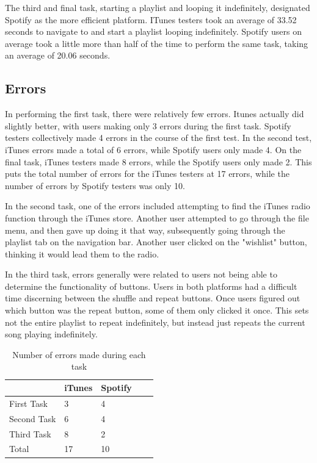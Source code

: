 \documentclass[12pt]{report}
\begin{document}
The third and final task, starting a playlist and looping it 
indefinitely, designated Spotify as the more efficient platform. 
ITunes testers took an average of 33.52 seconds to navigate to and 
start a playlist looping indefinitely. Spotify users on average 
took a little more than half of the time to perform the same task, 
taking an average of 20.06 seconds.

\subsection{Errors}

In performing the first task, there were relatively few errors. 
Itunes actually did slightly better, with users making only 3 
errors during the first task. Spotify testers collectively made 4 
errors in the course of the first test. In the second test, iTunes 
errors made a total of 6 errors, while Spotify users only made 4. 
On the final task, iTunes testers made 8 errors, while the Spotify 
users only made 2. This puts the total number of errors for the 
iTunes testers at 17 errors, while the number of errors by Spotify 
testers was only 10.

In the second task, one of the errors included attempting to find 
the iTunes radio function through the iTunes store. Another user 
attempted to go through the file menu, and then gave up doing it 
that way, subsequently going through the playlist tab on the 
navigation bar. Another user clicked on the "wishlist" button, 
thinking it would lead them to the radio.

In the third task,  errors generally were related to users not 
being able to determine the functionality of buttons. Users in 
both platforms had a difficult time discerning between the shuffle 
and repeat buttons. Once users figured out which button was the 
repeat button, some of them only clicked it once. This sets not 
the entire playlist to repeat indefinitely, but instead just 
repeats the current song playing indefinitely.

\begin{table}[h]
\centering
\begin{tabular}{lllll}
\hline
            & iTunes & Spotify &  &  \\ \hline
First Task  & 3      & 4       &  &  \\
Second Task & 6      & 4       &  &  \\
Third Task  & 8      & 2       &  &  \\ \hline
Total       & 17     & 10      &  & 
\end{tabular}
\caption{Number of errors made during each task}
\end{table}
\end{document}
